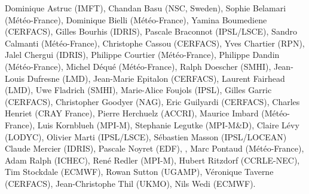 Dominique Astruc (IMFT),
Chandan Basu (NSC, Sweden),
Sophie Belamari (M\'et\'eo-France),
Dominique Bielli (M\'et\'eo-France),
Yamina Boumediene (CERFACS), 
Gilles Bourhis (IDRIS),
Pascale Braconnot (IPSL/LSCE),
Sandro Calmanti (M\'et\'eo-France),
Christophe Cassou (CERFACS),
Yves Chartier (RPN),
Jalel Chergui (IDRIS),
Philippe Courtier (M\'et\'eo-France),
Philippe Dandin (M\'et\'eo-France),
Michel D\'equ\'e (M\'et\'eo-France),
Ralph Doescher (SMHI),
Jean-Louis Dufresne (LMD),
Jean-Marie Epitalon (CERFACS),
Laurent Fairhead (LMD),
Uwe Fladrich (SMHI),
Marie-Alice Foujols (IPSL),
Gilles Garric (CERFACS),
Christopher Goodyer (NAG),
Eric Guilyardi (CERFACS),
Charles Henriet (CRAY France),
Pierre Herchuelz (ACCRI),
Maurice Imbard (M\'et\'eo-France),
Luis Kornblueh (MPI-M),
Stephanie Legutke (MPI-M\&D),
Claire L\'evy (LODYC),
Olivier Marti (IPSL/LSCE),
S\'ebastien Masson (IPSL/LOCEAN)
Claude Mercier (IDRIS),
Pascale Noyret (EDF),
,
Marc Pontaud (M\'et\'eo-France),
Adam Ralph (ICHEC),
Ren\'e Redler (MPI-M),
Hubert Ritzdorf (CCRLE-NEC),
Tim Stockdale (ECMWF),
Rowan Sutton (UGAMP),
V\'eronique Taverne (CERFACS),
Jean-Christophe Thil (UKMO),
Nils Wedi (ECMWF).



